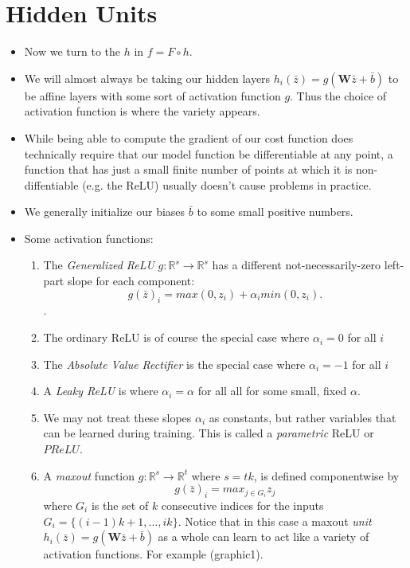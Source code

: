 \documentclass{article}
\begin{document}
\section{Hidden Units}
\begin{itemize}
\item Now we turn to the $h$ in $f = F \circ h$.
\item We will almost always be taking our hidden layers $h_{i}(\bar{z}) = g(\mathbf{W}\bar{z} + \bar{b})$ to be affine layers with some sort of activation function $g$.  Thus the choice of activation function is where the variety appears.
\item While being able to compute the gradient of our cost function does technically require that our model function be differentiable at any point, a function that has just a small finite number of points at which it is non-diffentiable (e.g. the ReLU) usually doesn't cause problems in practice.

\item We generally initialize our biases $\bar{b}$ to some small positive numbers.

\item Some activation functions:

\begin{enumerate}

\item The \emph{Generalized ReLU} $g:\mathbb{R}^{s} \rightarrow \mathbb{R}^{s}$ has a different not-necessarily-zero left-part slope for each component:  $$g(\bar{z})_{i} = max(0, z_{i}) + \alpha_{i} min(0, z_{i}).$$. 

\item The ordinary ReLU  is of course the special case where $\alpha_{i} = 0$ for all $i$ 
\item The \emph{Absolute Value Rectifier} is the special case where $\alpha_{i} = -1$ for all $i$ 
\item A \emph{Leaky ReLU} is where $\alpha_{i} = \alpha$ for all all for some small, fixed $\alpha$.
\item We may not treat these slopes $\alpha_{i}$ as constants, but rather variables that can be learned during training.  This is called a \emph{parametric} ReLU or $PReLU$.
\item A \emph{maxout} function $g:\mathbb{R}^{s} \rightarrow \mathbb{R}^{t}$ where $s = tk$, is defined componentwise by 
$$g(\bar{z})_{i} = max_{j \in G_{i}} z_{j}$$ where $G_{i}$ is the set of $k$ consecutive indices for the inputs $G_{i} = \{(i-1)k + 1, \ldots, ik\}$.  Notice that in this case a maxout \emph{unit} $h_{i}(\bar{z}) = g(\mathbf{W}\bar{z} + \bar{b})$ as a whole can learn to act like a variety of activation functions.  For example (graphic1).


\end{enumerate}
\end{itemize}
\end{document}
